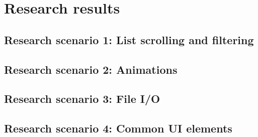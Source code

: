 
\chapter{Research results}

\section{Research scenario 1: List scrolling and filtering}

\section{Research scenario 2: Animations}

\section{Research scenario 3: File I/O}

\section{Research scenario 4: Common UI elements}
